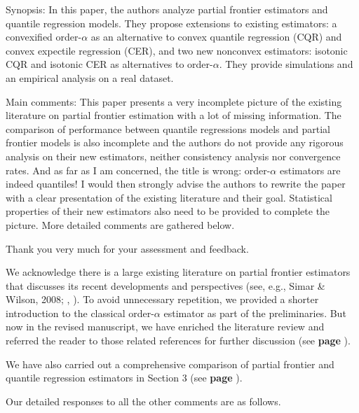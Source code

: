 \documentclass[12pt]{article}
\newcommand{\np}{\vskip 0.3cm}
\begin{document}
\begin{sf}
{\blueb Synopsis: In this paper, the authors analyze partial frontier estimators and quantile regression models. They propose extensions to existing estimators: a convexified order-$\alpha$ as an alternative to convex quantile regression (CQR) and convex expectile regression (CER), and two new nonconvex estimators: isotonic CQR and isotonic CER as alternatives to order-$\alpha$. They provide simulations and an empirical analysis on a real dataset. \np  

Main comments: This paper presents a very incomplete picture of the existing literature on partial frontier estimation with a lot of missing information. The comparison of performance between quantile regressions models and partial frontier models is also incomplete and the authors do not provide any rigorous analysis on their new estimators, neither consistency analysis nor convergence rates. And as far as I am concerned, the title is wrong: order-$\alpha$ estimators are indeed quantiles! I would then strongly advise the authors to rewrite the paper with a clear presentation of the existing literature and their goal. Statistical properties of their new estimators also need to be provided to complete the picture. More detailed comments are gathered below. } 
\end{sf}
\begin{response}
Thank you very much for your assessment and feedback.\np

We acknowledge there is a large existing literature on partial frontier estimators that discusses its recent developments and perspectives (see, e.g., Simar \& Wilson, 2008; , \citeyear*{Simar2013}). To avoid unnecessary repetition, we provided a shorter introduction to the classical order-$\alpha$ estimator as part of the preliminaries. But now in the revised manuscript, we have enriched the literature review and referred the reader to those related references for further discussion (see \textbf{page }).\np

We have also carried out a comprehensive comparison of partial frontier and quantile regression estimators in Section 3 (see \textbf{page }).\np

Our detailed responses to all the other comments are as follows. 
\end{response}

\end{document}
